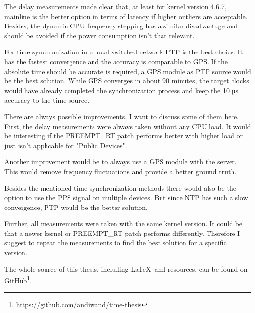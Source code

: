 The delay measurements made clear that, at least for kernel version 4.6.7, mainline is the better option in terms of latency if higher outliers are acceptable. Besides, the dynamic CPU frequency stepping has a similar disadvantage and should be avoided if the power consumption isn't that relevant.

For time synchronization in a local switched network PTP is the best choice. It has the fastest convergence and the accuracy is comparable to GPS. If the absolute time should be accurate is required, a GPS module as PTP source would be the best solution. While GPS converges in about 90 minutes, the target clocks would have already completed the synchronization process and keep the 10 µs accuracy to the time source.

There are always possible improvements. I want to discuss some of them here.
First, the delay measurements were always taken without any CPU load. It would be interesting if the PREEMPT\_RT patch performs better with higher load or just isn't applicable for "Public Devices".

Another improvement would be to always use a GPS module with the server. This would remove frequency fluctuations and provide a better ground truth.

Besides the mentioned time synchronization methods there would also be the option to use the PPS signal on multiple devices. But since NTP has such a slow convergence, PTP would be the better solution.

Further, all measurements were taken with the same kernel version. It could be that a newer kernel or PREEMPT\_RT patch performs differently. Therefore I suggest to repeat the measurements to find the best solution for a specific version.

The whole source of this thesis, including \LaTeX\  and resources, can be found on GitHub\footnote{\url{https://github.com/andiwand/time-thesis}}.
